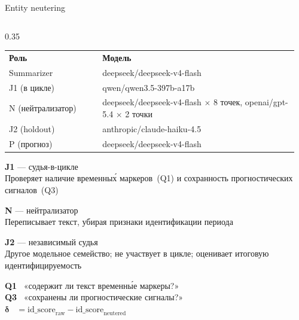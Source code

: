 \begin{frame}[t]{Entity neutering}
\begin{columns}[T, totalwidth=\textwidth]
\begin{column}{0.35\textwidth}
    \vspace{0.14cm}
    {\fontsize{4.2}{5.3}\selectfont\color{BPText}
    \begin{tabular}{@{}p{0.31\linewidth}p{0.65\linewidth}@{}}
      \textbf{Роль} & \textbf{Модель} \\
      Summarizer & deepseek/deepseek-v4-flash \\
      J1 (в цикле) & qwen/qwen3.5-397b-a17b \\
      N (нейтрализатор) & deepseek/deepseek-v4-flash $\times$ 8 точек, openai/gpt-5.4 $\times$ 2 точки \\
      J2 (holdout) & anthropic/claude-haiku-4.5 \\
      P (прогноз) & deepseek/deepseek-v4-flash \\
    \end{tabular}
    }

    \vspace{0.18cm}
    {\fontsize{5.2}{7.2}\selectfont\color{BPText}

    \textbf{J1} — судья-в-цикле\\
    Проверяет наличие временны\'{х} маркеров~(Q1)
    и сохранность прогностических сигналов~(Q3)

    \vspace{0.18cm}
    \textbf{N} — нейтрализатор\\
    Переписывает текст, убирая признаки
    идентификации периода

    \vspace{0.18cm}
    \textbf{J2} — независимый судья\\
    Другое модельное семейство; не участвует
    в цикле; оценивает итоговую идентифицируемость

    \vspace{0.24cm}
    {\color{BPMuted}\fontsize{5}{7}\selectfont
    \textbf{Q1} \ «содержит ли текст временн\'{ы}е маркеры?»\\[3pt]
    \textbf{Q3} \ «сохранены ли прогностические сигналы?»\\[3pt]
    $\boldsymbol{\delta}$ \ $= \text{id\_score}_{\text{raw}} - \text{id\_score}_{\text{neutered}}$
    }

    }
  \end{column}

\end{columns}

\end{frame}
